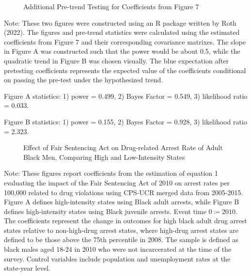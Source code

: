   \clearpage

  \begin{figure}[h]
    \centering
    \caption{Additional Pre-trend Testing for Coefficients from Figure 7}%
    \qquad
    \label{fig:pre-trends_roth}%
  \end{figure}

  \begin{footnotesize}
    \noindent Note: These two figures were constructed using an R package written by Roth (2022). The figures and pre-trend statistics were calculated using the estimated coefficients from Figure 7 and their corresponding covariance matrixes. The slope in Figure A was constructed such that the power would be about 0.5, while the quadratic trend in Figure B was chosen visually. The blue expectation after pretesting coefficients represents the expected value of the coefficients conditional on passing the pre-test under the hypothesized trend.

    Figure A statistics: 1) power = 0.499, 2) Bayes Factor = 0.549, 3) likelihood ratio = 0.033.

    Figure B statistics: 1) power = 0.155, 2) Bayes Factor = 0.928, 3) likelihood ratio = 2.323.
  \end{footnotesize}

  \clearpage
  
  \begin{figure}[h]
    \centering
    \caption{Effect of Fair Sentencing Act on Drug-related Arrest Rate of Adult Black Men, Comparing High and Low-Intensity States}%
    \qquad
    \label{fig:fs_es_2010}%
  \end{figure}


  \begin{footnotesize}
    \noindent Note: These figures report coefficients from the estimation of equation 1 evaluating the impact of the Fair Sentencing Act of 2010 on arrest rates per 100,000 related to drug violations using CPS-UCR merged data from 2005-2015. Figure A defines high-intensity states using Black adult arrests, while Figure B defines high-intensity states using Black juvenile arrests. Event time $0 \coloneqq 2010$. The coefficients represent the change in outcomes for high black adult drug arrest states relative to non-high-drug arrest states, where high-drug arrest states are defined to be those above the 75th percentile in 2008. The sample is defined as black males aged 18-24 in 2010 who were not incarcerated at the time of the survey. Control variables include population and unemployment rates at the state-year level. 
  \end{footnotesize}

